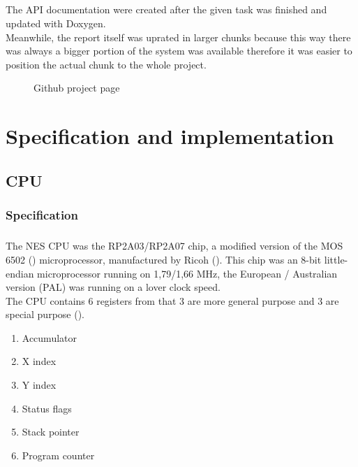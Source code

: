 \documentclass[]{report}
\begin{document}
\paragraph{ }
The API documentation were created after the given task was finished and updated with Doxygen.
\\
Meanwhile, the report itself was uprated in larger chunks because this way there was always a bigger portion of the system was available therefore it was easier to position the actual chunk to the whole project.

\begin{figure}[!htb]
\caption{\label{fig:my-label} Github project page}
\end{figure}

\chapter{Specification and implementation}

\section{CPU}



\subsection{Specification}



\paragraph{ }
The NES CPU was the RP2A03/RP2A07 chip, a modified version of the MOS 6502 (\cite{6502}) microprocessor, manufactured by Ricoh (\cite{RCHO}). This chip was an 8-bit little-endian microprocessor running on 1,79/1,66 MHz, the European / Australian version (PAL) was running on a lover clock speed.
\\
The CPU contains 6 registers from that 3 are more general purpose  and 3 are special purpose (\cite{REGS}).
\begin{enumerate}
	\item Accumulator
	\item X index
	\item Y index
	\item Status flags
	\item Stack  pointer
	\item Program counter
\end{enumerate}
\end{document}
